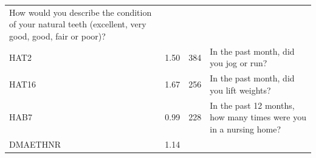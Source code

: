 \documentclass[12pt,oneside]{reedthesis}
\theoremstyle{definition}
\theoremstyle{definition}
\theoremstyle{definition}
\theoremstyle{remark}
\begin{document}
\begin{longtable}[]{@{}llll@{}}
\begin{minipage}[t]{0.33\columnwidth}
How would you describe the condition of your natural teeth (excellent,
very good, good, fair or poor)?\strut
\end{minipage}\tabularnewline
\begin{minipage}[t]{0.21\columnwidth}\raggedright
HAT2\strut
\end{minipage} & \begin{minipage}[t]{0.23\columnwidth}\raggedright
1.50\strut
\end{minipage} & \begin{minipage}[t]{0.12\columnwidth}\raggedright
384\strut
\end{minipage} & \begin{minipage}[t]{0.33\columnwidth}\raggedright
In the past month, did you jog or run?\strut
\end{minipage}\tabularnewline
\begin{minipage}[t]{0.21\columnwidth}\raggedright
HAT16\strut
\end{minipage} & \begin{minipage}[t]{0.23\columnwidth}\raggedright
1.67\strut
\end{minipage} & \begin{minipage}[t]{0.12\columnwidth}\raggedright
256\strut
\end{minipage} & \begin{minipage}[t]{0.33\columnwidth}\raggedright
In the past month, did you lift weights?\strut
\end{minipage}\tabularnewline
\begin{minipage}[t]{0.21\columnwidth}\raggedright
HAB7\strut
\end{minipage} & \begin{minipage}[t]{0.23\columnwidth}\raggedright
0.99\strut
\end{minipage} & \begin{minipage}[t]{0.12\columnwidth}\raggedright
228\strut
\end{minipage} & \begin{minipage}[t]{0.33\columnwidth}\raggedright
In the past 12 months, how many times were you in a nursing home?\strut
\end{minipage}\tabularnewline
\begin{minipage}[t]{0.21\columnwidth}\raggedright
DMAETHNR\strut
\end{minipage} & \begin{minipage}[t]{0.23\columnwidth}\raggedright
1.14\strut
\end{minipage} & \begin{minipage}[t]{0.12\columnwidth}\raggedright

\end{minipage}
\end{longtable}
\end{document}
